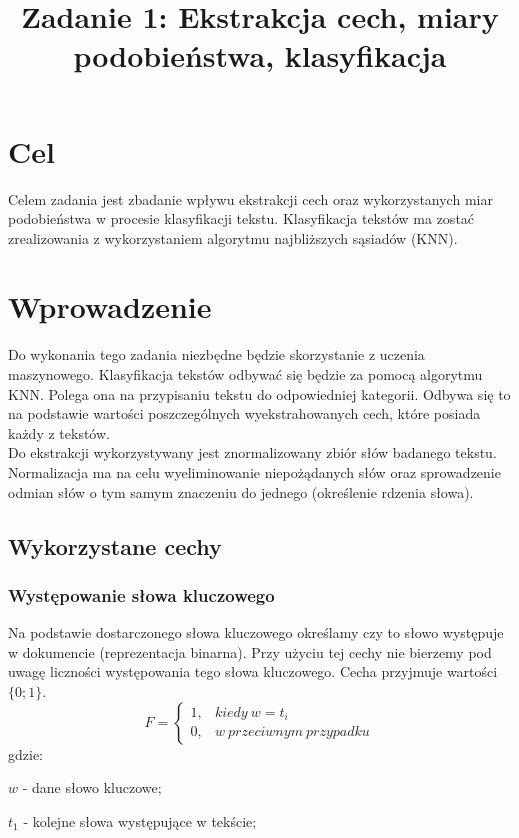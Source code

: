 \documentclass{classrep}
\author{
  \studentinfo{Konrad Jachimstal}{211807} \and
  \studentinfo{ Patryk Janicki}{211951}
}
\title{Zadanie 1: Ekstrakcja cech, miary podobieństwa, klasyfikacja}
\begin{document}
\pgfplotsset{scaled y ticks=true}
\maketitle

\section{Cel}
{Celem zadania jest zbadanie wpływu ekstrakcji cech oraz wykorzystanych miar podobieństwa w procesie klasyfikacji tekstu. 
Klasyfikacja tekstów ma zostać zrealizowania z wykorzystaniem algorytmu najbliższych sąsiadów (KNN).}

\section{Wprowadzenie}
Do wykonania tego zadania niezbędne będzie skorzystanie z uczenia maszynowego.
Klasyfikacja tekstów odbywać się będzie za pomocą algorytmu KNN. Polega ona na przypisaniu tekstu do odpowiedniej
kategorii. Odbywa się to na podstawie wartości poszczególnych wyekstrahowanych cech, które posiada każdy z tekstów.\\
Do ekstrakcji wykorzystywany jest znormalizowany zbiór słów badanego tekstu. Normalizacja ma na
celu wyeliminowanie niepożądanych słów oraz sprowadzenie odmian słów o tym samym znaczeniu do jednego (określenie rdzenia słowa).
\clearpage
\subsection[]{Wykorzystane cechy} \label{wykorzystane_cechy}
\subsubsection{Występowanie słowa kluczowego}
Na podstawie dostarczonego słowa kluczowego określamy czy to słowo występuje w dokumencie (reprezentacja binarna).
Przy użyciu tej cechy nie bierzemy pod uwagę liczności występowania tego słowa kluczowego. Cecha przyjmuje wartości $\{0; 1\}$.
\begin{equation}
    F=\left\{\begin{matrix}
                 1, & kiedy\ w = t_{i}\\
                 0, & w\ przeciwnym\ przypadku
    \end{matrix}\right.
\end{equation}
gdzie:\\
\begin{description}
    \item $w$ - dane słowo kluczowe;
    \item $t_{1}$ - kolejne słowa występujące w tekście;
\end{description}
\end{document}

